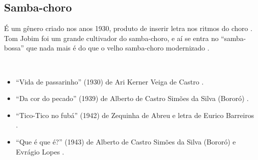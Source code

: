 \subsection{Samba-choro}\label{subsec:musicsambachoro}
É um gênero criado nos anos 1930, produto de inserir letra nos ritmos do choro \cite[pp. 291]{dourado2004dicionario}.
Tom Jobim foi um grande cultivador do samba-choro, 
e aí se entra no ``samba-bossa'' que nada mais é do que o velho samba-choro modernizado \cite[pp. 63]{reinato2010musica}.
\begin{example} ~

\begin{itemize}
\item ``Vida de passarinho'' (1930) de Ari Kerner Veiga de Castro  \cite[pp. 291]{dourado2004dicionario}.
\item ``Da cor do pecado'' (1939) de Alberto de Castro Simões da Silva (Bororó) \cite[pp. 105]{marcondes1977enciclopedia}.
\item ``Tico-Tico no fubá'' (1942) de Zequinha de Abreu e letra de Eurico Barreiros \cite[pp. 6]{marcondes1998enciclopedia} \cite[pp. 39,91]{diniz2003almanaque}.
\item ``Que é que é?''  (1943) de Alberto de Castro Simões da Silva (Bororó) e Evrágio Lopes \cite[pp. 105]{marcondes1977enciclopedia}.
\end{itemize}
\end{example}


